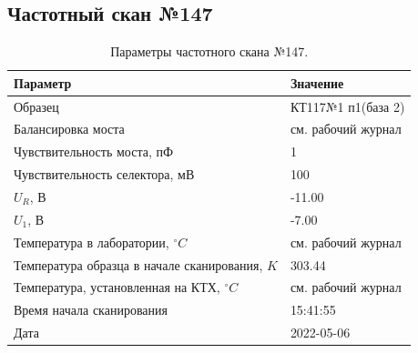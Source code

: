 \subsection{Частотный скан №147}
\begin{table}[!ht]
    \centering
    \caption{Параметры частотного скана №147.}
    \begin{tabular}{|l|l|}
        \hline
        Параметр                                       & Значение                  \\ \hline
        Образец                                        & КТ117№1 п1(база 2)        \\ \hline
        Балансировка моста                             & см. рабочий журнал        \\ \hline
        Чувствительность моста, пФ                     & 1                         \\ \hline
        Чувствительность селектора, мВ                 & 100                       \\ \hline
        $U_R$, В                                       & -11.00                    \\ \hline
        $U_1$, В                                       & -7.00                     \\ \hline
        Температура в лаборатории, $^\circ C$          & см. рабочий журнал        \\ \hline
        Температура образца в начале сканирования, $K$ & 303.44                    \\ \hline
        Температура, установленная на КТХ, $^\circ C$  & см. рабочий журнал        \\ \hline
        Время начала сканирования                      & 15:41:55                  \\ \hline
        Дата                                           & 2022-05-06                \\ \hline
    \end{tabular}
    \label{table:frequency_scan_147}
\end{table}

